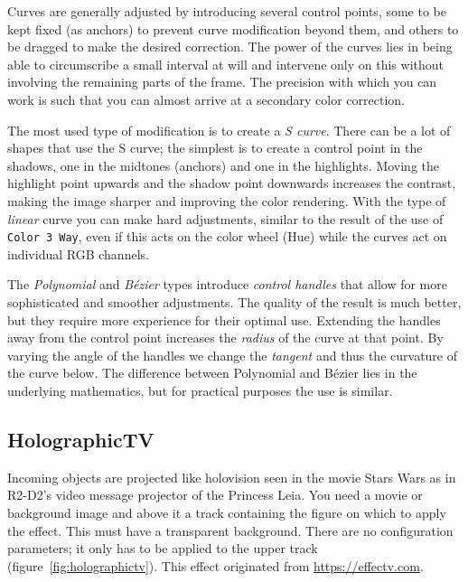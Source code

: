 Curves are generally adjusted by introducing several control points, some to be kept fixed (as anchors) to prevent curve modification beyond them, and others to be dragged to make the desired correction. The power of the curves lies in being able to circumscribe a small interval at will and intervene only on this without involving the remaining parts of the frame. The precision with which you can work is such that you can almost arrive at a secondary color correction.

The most used type of modification is to create a \textit{S curve}. There can be a lot of shapes that use the S curve; the simplest is to create a control point in the shadows, one in the midtones (anchors) and one in the highlights. Moving the highlight point upwards and the shadow point downwards increases the contrast, making the image sharper and improving the color rendering. With the type of \textit{linear} curve you can make hard adjustments, similar to the result of the use of \texttt{Color 3 Way}, even if this acts on the color wheel (Hue) while the curves act on individual RGB channels.

The \textit{Polynomial} and \textit{Bézier} types introduce \textit{control handles} that allow for more sophisticated and smoother adjustments. The quality of the result is much better, but they require more experience for their optimal use. Extending the handles away from the control point increases the \textit{radius} of the curve at that point. By varying the angle of the handles we change the \textit{tangent} and thus the curvature of the curve below. The difference between Polynomial and Bézier lies in the underlying mathematics, but for practical purposes the use is similar.

\subsection{HolographicTV}%
\label{sub:holographictv}

Incoming objects are projected like holovision seen in the movie Stars Wars as in R2-D2's video message projector of the Princess Leia. You need a movie or background image and above it a track containing the figure on which to apply the effect. This must have a transparent background. There are no configuration parameters; it only has to be applied to the upper track (figure~\ref{fig:holographictv}). This effect originated from \url{https://effectv.com}.

